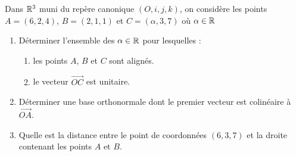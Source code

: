 \documentclass[a4paper]{article}
\begin{document}
 Dans $\mathbb{R}^3$ muni du repère canonique $(O,i,j,k)$, on considère les points $A=(6,2,4)$, $B=(2,1,1)$ et $C=(\alpha,3,7)$ où $\alpha \in \mathbb{R}$
\begin{enumerate}
\item Déterminer l'ensemble des $\alpha\in\mathbb{R}$ pour lesquelles :
	\begin{enumerate}
		\item les points $A$, $B$ et $C$ sont alignés.
\vspace*{5cm}
		\item le vecteur $\overrightarrow{OC}$ est unitaire.
\vspace*{5cm}
	\end{enumerate}
\item Déterminer une base orthonormale dont le premier vecteur est colinéaire à $\overrightarrow{OA}$.
\vspace{7cm}
\vspace*{3.5cm}

\item Quelle est la distance entre le point de coordonnées $(6,3,7)$ et la droite contenant les points $A$ et $B$.
\vspace*{5cm}
\end{enumerate}
\end{document}

